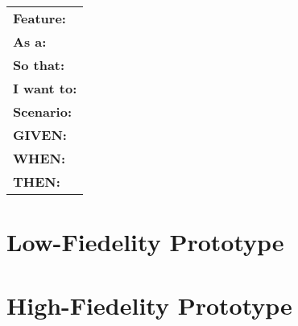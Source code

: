 \documentclass{article}
\begin{document}
\begin{table}[h]
\begin{tabular}{|l|}
\hline
\textbf{Feature:} \\
\textbf{As a:} \\
\textbf{So that:} \\
\textbf{I want to:} \\
\textbf{Scenario:} \\
\textbf{GIVEN:} \\
\textbf{WHEN:} \\
\textbf{THEN:} \\
\hline
\end{tabular}
\end{table}

\section{Low-Fiedelity Prototype}

\section{High-Fiedelity Prototype}
\end{document}
